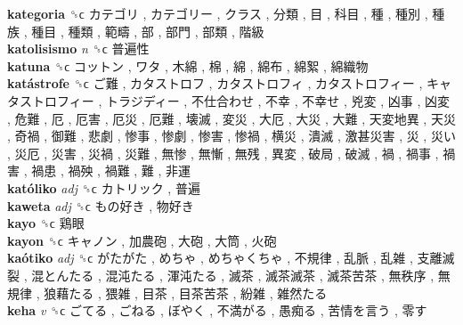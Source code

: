 \textbf{kategoria} ␝ϲ   カテゴリ ,  カテゴリー ,  クラス ,  分類 ,  目 ,  科目 ,  種 ,  種別 ,  種族 ,  種目 ,  種類 ,  範疇 ,  部 ,  部門 ,  部類 ,  階級   \\
\textbf{katolisismo} \emph{n}  ␝ϲ   普遍性   \\
\textbf{katuna} ␝ϲ   コットン ,  ワタ ,  木綿 ,  棉 ,  綿 ,  綿布 ,  綿絮 ,  綿織物   \\
\textbf{katástrofe} ␝ϲ   ご難 ,  カタストロフ ,  カタストロフィ ,  カタストロフィー ,  キャタストロフィー ,  トラジディー ,  不仕合わせ ,  不幸 ,  不幸せ ,  兇変 ,  凶事 ,  凶変 ,  危難 ,  厄 ,  厄害 ,  厄災 ,  厄難 ,  壊滅 ,  変災 ,  大厄 ,  大災 ,  大難 ,  天変地異 ,  天災 ,  奇禍 ,  御難 ,  悲劇 ,  惨事 ,  惨劇 ,  惨害 ,  惨禍 ,  横災 ,  潰滅 ,  激甚災害 ,  災 ,  災い ,  災厄 ,  災害 ,  災禍 ,  災難 ,  無惨 ,  無慚 ,  無残 ,  異変 ,  破局 ,  破滅 ,  禍 ,  禍事 ,  禍害 ,  禍患 ,  禍殃 ,  禍難 ,  難 ,  非運   \\
\textbf{katóliko} \emph{adj}  ␝ϲ   カトリック ,  普遍   \\
\textbf{kaweta} \emph{adj}  ␝ϲ   もの好き ,  物好き   \\
\textbf{kayo} ␝ϲ   鶏眼   \\
\textbf{kayon} ␝ϲ   キャノン ,  加農砲 ,  大砲 ,  大筒 ,  火砲   \\
\textbf{kaótiko} \emph{adj}  ␝ϲ   がたがた ,  めちゃ ,  めちゃくちゃ ,  不規律 ,  乱脈 ,  乱雑 ,  支離滅裂 ,  混とんたる ,  混沌たる ,  渾沌たる ,  滅茶 ,  滅茶滅茶 ,  滅茶苦茶 ,  無秩序 ,  無規律 ,  狼藉たる ,  猥雑 ,  目茶 ,  目茶苦茶 ,  紛雑 ,  雑然たる   \\
\textbf{keha} \emph{v}  ␝ϲ   ごてる ,  ごねる ,  ぼやく ,  不満がる ,  愚痴る ,  苦情を言う ,  零す   \\
